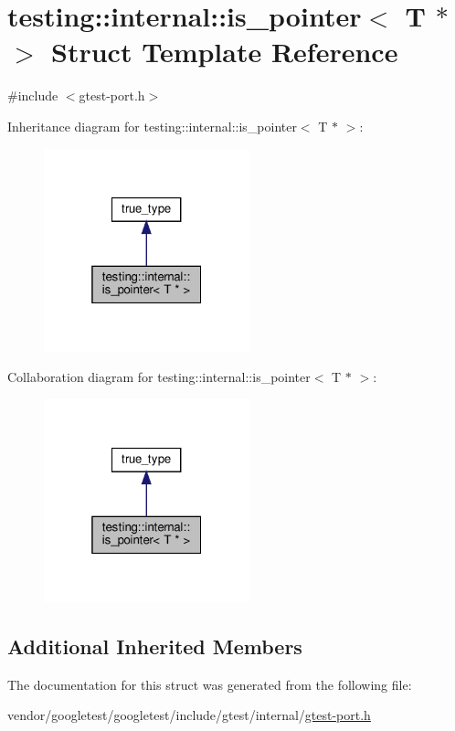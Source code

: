 \hypertarget{structtesting_1_1internal_1_1is__pointer_3_01_t_01_5_01_4}{}\section{testing\+:\+:internal\+:\+:is\+\_\+pointer$<$ T $\ast$ $>$ Struct Template Reference}
\label{structtesting_1_1internal_1_1is__pointer_3_01_t_01_5_01_4}


{\ttfamily \#include $<$gtest-\/port.\+h$>$}



Inheritance diagram for testing\+:\+:internal\+:\+:is\+\_\+pointer$<$ T $\ast$ $>$\+:
\nopagebreak
\begin{figure}[H]
\begin{center}
\leavevmode
\includegraphics[width=169pt]{structtesting_1_1internal_1_1is__pointer_3_01_t_01_5_01_4__inherit__graph}
\end{center}
\end{figure}


Collaboration diagram for testing\+:\+:internal\+:\+:is\+\_\+pointer$<$ T $\ast$ $>$\+:
\nopagebreak
\begin{figure}[H]
\begin{center}
\leavevmode
\includegraphics[width=169pt]{structtesting_1_1internal_1_1is__pointer_3_01_t_01_5_01_4__coll__graph}
\end{center}
\end{figure}
\subsection*{Additional Inherited Members}


The documentation for this struct was generated from the following file\+:\begin{DoxyCompactItemize}
\item 
vendor/googletest/googletest/include/gtest/internal/\hyperlink{gtest-port_8h}{gtest-\/port.\+h}\end{DoxyCompactItemize}
